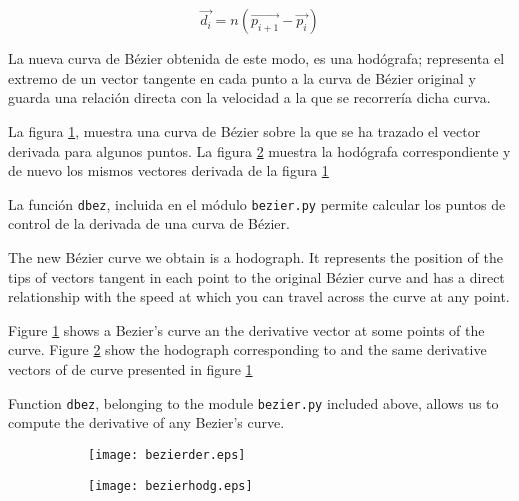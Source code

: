 \begin{equation*}
\vec{d_i} = n\left(\vec{p_{i+1}} -\vec{p_i}\right)
\end{equation*}
\begin{paracol}{2}
La nueva curva de Bézier obtenida de este modo, es una hodógrafa; representa el extremo de un vector tangente en cada punto a la curva de Bézier original  y guarda una relación directa con la velocidad a la que se recorrería dicha curva. 

La figura \ref{fig:bzc}, muestra una curva de Bézier sobre la que se ha trazado el vector derivada para algunos puntos. La figura \ref{fig:bzd} muestra la hodógrafa correspondiente y de nuevo los mismos vectores derivada de la figura \ref{fig:bzc}

La función \texttt{dbez}, incluida en el módulo \texttt{bezier.py} permite calcular los puntos de control de la derivada de una curva de Bézier.

\switchcolumn
The new Bézier curve we obtain is a hodograph. It represents the position of the tips of vectors tangent in each point to the original Bézier curve and has a direct relationship with the speed at which you can travel across the curve at any point.

Figure \ref{fig:bzc} shows a Bezier's curve an the derivative vector at some points of the curve. Figure \ref{fig:bzd} show the hodograph corresponding to and the same derivative vectors of de curve presented in figure \ref{fig:bzc}  

Function \texttt{dbez}, belonging to the module \texttt{bezier.py} included above, allows us to compute  the derivative of any Bezier's curve.
\end{paracol}

\begin{figure}[h]
\centering
\begin{subfigure}{0.45\textwidth}
	\texttt{[image: bezierder.eps]}
	 \label{fig:bzc} 
\end{subfigure}
\begin{subfigure}{0.45\textwidth}
	\texttt{[image: bezierhodg.eps]}
	 \label{fig:bzd}
\end{subfigure}
\label{fig:bzder}
\end{figure} 

